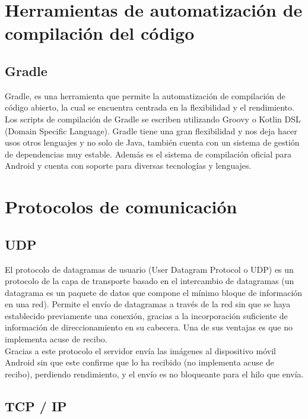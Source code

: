 \section{Herramientas de automatización de compilación del código}

\subsection{Gradle}

Gradle, es una herramienta que permite la automatización de compilación de código abierto, la cual se encuentra centrada en la flexibilidad y el rendimiento. Los scripts de compilación de Gradle se escriben utilizando Groovy o Kotlin DSL (Domain Specific Language). Gradle tiene una gran flexibilidad y nos deja hacer usos otros lenguajes y no solo de Java, también cuenta con un sistema de gestión de dependencias muy estable. Además es el sistema de compilación oficial para Android y cuenta con soporte para diversas tecnologías y lenguajes.



\section{Protocolos de comunicación}

\subsection{UDP}

El protocolo de datagramas de usuario (User Datagram Protocol o UDP) es un protocolo de la capa de transporte basado en el intercambio de datagramas (un datagrama es un paquete de datos que compone el mínimo bloque de información en una red). Permite el envío de datagramas a través de la red sin que se haya establecido previamente una conexión, gracias a la incorporación suficiente de información de direccionamiento en su cabecera. Una de sus ventajas es que no implementa acuse de recibo.\\
Gracias a este protocolo el servidor envía las imágenes al dispositivo móvil Android sin que este confirme que lo ha recibido (no implementa acuse de recibo), perdiendo rendimiento, y el envío es no bloqueante para el hilo que envía.

\subsection{TCP / IP}

